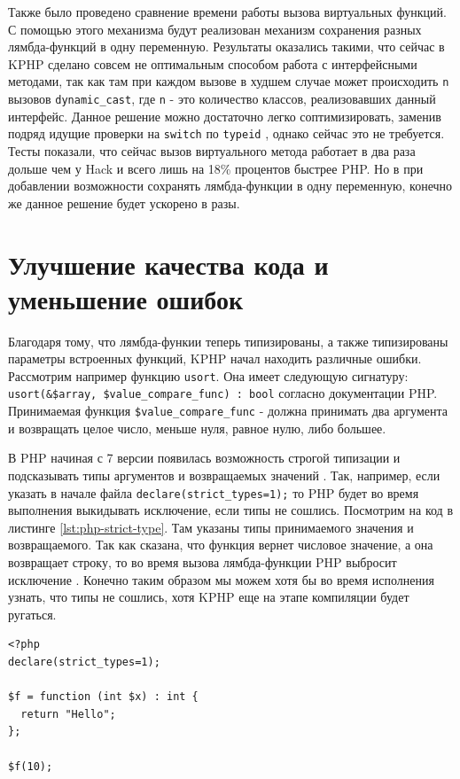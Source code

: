 Также было проведено сравнение времени работы вызова виртуальных функций.
С помощью этого механизма будут реализован механизм сохранения разных лямбда-функций в одну переменную.
Результаты оказались такими, что сейчас в KPHP сделано совсем не оптимальным способом работа с интерфейсными методами, так как там при каждом вызове в худшем случае может происходить \verb|n| вызовов \verb|dynamic_cast|, где \verb|n| - это количество классов, реализовавших данный интерфейс.
Данное решение можно достаточно легко соптимизировать, заменив подряд идущие проверки на \verb|switch| по \verb|typeid| \cite{fast-dynamic-cast}, однако сейчас это не требуется.
Тесты показали, что сейчас вызов виртуального метода работает в два раза дольше чем у Hack и всего лишь на 18\% процентов быстрее PHP.
Но в при добавлении возможности сохранять лямбда-функции в одну переменную, конечно же данное решение будет ускорено в разы.


\section{Улучшение качества кода и уменьшение ошибок}
Благодаря тому, что лямбда-функии теперь типизированы, а также типизированы параметры встроенных функций, KPHP начал находить различные ошибки.
Рассмотрим например функцию \verb|usort|.
Она имеет следующую сигнатуру: \verb|usort(&$array, $value_compare_func) : bool| согласно документации PHP.
Принимаемая функция \verb|$value_compare_func| - должна принимать два аргумента и возвращать целое число, меньше нуля, равное нулю, либо большее.

В PHP начиная с 7 версии появилась возможность строгой типизации и подсказывать типы аргументов и возвращаемых значений \cite{php-7-strict-types}.
Так, например, если указать в начале файла \verb|declare(strict_types=1);| то PHP будет во время выполнения выкидывать исключение, если типы не сошлись.
Посмотрим на код в листинге \ref{lst:php-strict-type}.
Там указаны типы принимаемого значения и возвращаемого.
Так как сказана, что функция вернет числовое значение, а она возвращает строку, то во время вызова лямбда-функции PHP выбросит исключение \cite{php-7-pitfalls}.
Конечно таким образом мы можем хотя бы во время исполнения узнать, что типы не сошлись, хотя KPHP еще на этапе компиляции будет ругаться.
\begin{lstlisting}[caption={Пример типизации в PHP7}, label={lst:php-strict-type}]
<?php
declare(strict_types=1);

$f = function (int $x) : int {
  return "Hello";
};

$f(10);
\end{lstlisting}

